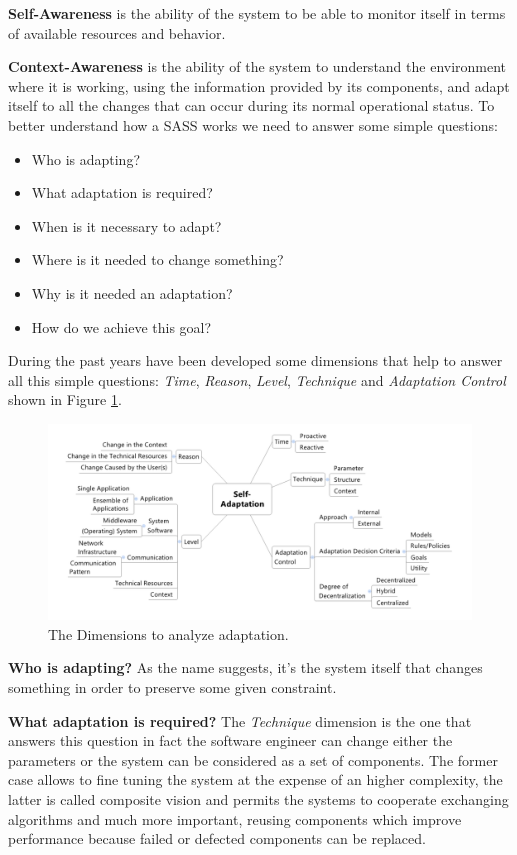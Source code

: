\textbf{Self-Awareness} is the ability of the system to be able to monitor itself in terms of available resources and behavior.

\textbf{Context-Awareness} is the ability of the system to understand the environment where it is working, using the information provided by its components, and adapt itself to all the changes that can occur during its normal operational status.
To better understand how a SASS works we need to answer some simple questions:
\begin{itemize}
	\item Who is adapting?
	\item What adaptation is required?
	\item When is it necessary to adapt?
	\item Where is it needed to change something?
	\item Why is it needed an adaptation?
	\item How do we achieve this goal?
\end{itemize}

During the past years have been developed some dimensions that help to answer all this simple questions: \emph{Time}, \emph{Reason}, \emph{Level}, \emph{Technique} and \emph{Adaptation Control} shown in Figure \ref{fig:dimensions}.
\begin{figure}[ht]
	\centerline
	{\includegraphics[scale=0.50]{img/dimensions.png}}
	\caption[The Dimensions]{The Dimensions to analyze adaptation.\cite{eng-appr-sas}}
	\label{fig:dimensions}
\end{figure}

\textbf{Who is adapting?} As the name suggests, it's the system itself that changes something in order to preserve some given constraint.

\textbf{What adaptation is required?} The \emph{Technique} dimension is the one that answers this question in fact the software engineer can change either the parameters or the system can be considered as a set of components. The former case allows to fine tuning the system at the expense of an higher complexity, the latter is called composite vision and permits the systems to cooperate exchanging algorithms and much more important, reusing components which improve performance because failed or defected components can be replaced.

